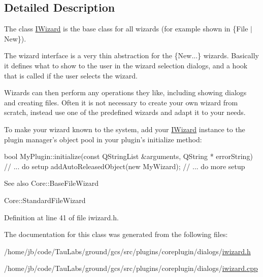 \subsection{\-Detailed \-Description}
\-The class \hyperlink{class_core_1_1_i_wizard}{\-I\-Wizard} is the base class for all wizards (for example shown in  \{\-File $|$ \-New\}). 

\-The wizard interface is a very thin abstraction for the \{\-New...\} wizards. \-Basically it defines what to show to the user in the wizard selection dialogs, and a hook that is called if the user selects the wizard.

\-Wizards can then perform any operations they like, including showing dialogs and creating files. \-Often it is not necessary to create your own wizard from scratch, instead use one of the predefined wizards and adapt it to your needs.

\-To make your wizard known to the system, add your \hyperlink{class_core_1_1_i_wizard}{\-I\-Wizard} instance to the plugin manager's object pool in your plugin's initialize method\-: 
\begin{DoxyCode}
        bool MyPlugin::initialize(const QStringList &arguments, QString *
      errorString)
        {
            // ... do setup
            addAutoReleasedObject(new MyWizard);
            // ... do more setup
        }
\end{DoxyCode}
 \begin{DoxySeeAlso}{\-See also}
\-Core\-::\-Base\-File\-Wizard 

\-Core\-::\-Standard\-File\-Wizard 
\end{DoxySeeAlso}


\-Definition at line 41 of file iwizard.\-h.



\-The documentation for this class was generated from the following files\-:\begin{DoxyCompactItemize}
\item 
/home/jb/code/\-Tau\-Labs/ground/gcs/src/plugins/coreplugin/dialogs/\hyperlink{iwizard_8h}{iwizard.\-h}\item 
/home/jb/code/\-Tau\-Labs/ground/gcs/src/plugins/coreplugin/dialogs/\hyperlink{iwizard_8cpp}{iwizard.\-cpp}\end{DoxyCompactItemize}
